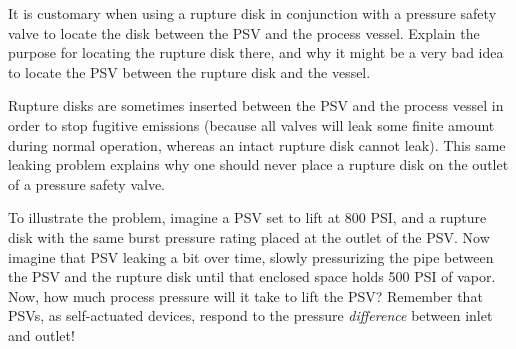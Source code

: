 

It is customary when using a rupture disk in conjunction with a pressure safety valve to locate the disk between the PSV and the process vessel.  Explain the purpose for locating the rupture disk there, and why it might be a very bad idea to locate the PSV between the rupture disk and the vessel.







Rupture disks are sometimes inserted between the PSV and the process vessel in order to stop fugitive emissions (because all valves will leak some finite amount during normal operation, whereas an intact rupture disk cannot leak).  This same leaking problem explains why one should never place a rupture disk on the outlet of a pressure safety valve.

\vskip 10pt

To illustrate the problem, imagine a PSV set to lift at 800 PSI, and a rupture disk with the same burst pressure rating placed at the outlet of the PSV.  Now imagine that PSV leaking a bit over time, slowly pressurizing the pipe between the PSV and the rupture disk until that enclosed space holds 500 PSI of vapor.  Now, how much process pressure will it take to lift the PSV?  Remember that PSVs, as self-actuated devices, respond to the pressure {\it difference} between inlet and outlet!












